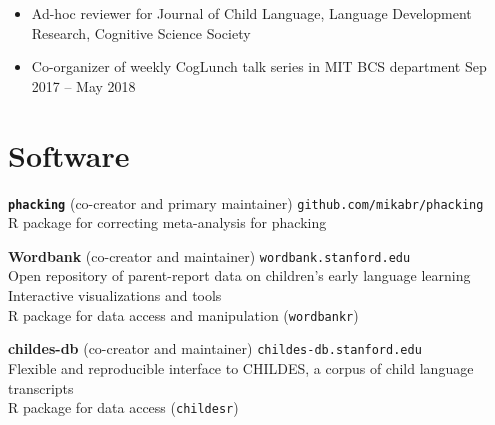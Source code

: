 \documentclass[11pt,]{article}
\providecommand{\tightlist}{%
  \setlength{\itemsep}{0pt}\setlength{\parskip}{0pt}}
\begin{document}
\begin{itemize}
\tightlist
\item
  Ad-hoc reviewer for Journal of Child Language, Language Development
  Research, Cognitive Science Society
\item
  Co-organizer of weekly CogLunch talk series in MIT BCS department
  \hfill Sep 2017 -- May 2018
\end{itemize}

\hypertarget{software}{%
\section{Software}\label{software}}

\textbf{\texttt{phacking}} (co-creator and primary maintainer)
\hfill \texttt{github.com/mikabr/phacking}\\
\hspace*{0.333em}\hspace*{0.333em}\hspace*{0.333em}R package for
correcting meta-analysis for phacking

\textbf{Wordbank} (co-creator and maintainer)
\hfill \texttt{wordbank.stanford.edu}\\
\hspace*{0.333em}\hspace*{0.333em}\hspace*{0.333em}Open repository of
parent-report data on children's early language learning \\
\hspace*{0.333em}\hspace*{0.333em}\hspace*{0.333em}Interactive
visualizations and tools \\
\hspace*{0.333em}\hspace*{0.333em}\hspace*{0.333em}R package for data
access and manipulation (\texttt{wordbankr})

\textbf{childes-db} (co-creator and maintainer)
\hfill \texttt{childes-db.stanford.edu}\\
\hspace*{0.333em}\hspace*{0.333em}\hspace*{0.333em}Flexible and
reproducible interface to CHILDES, a corpus of child language
transcripts \\
\hspace*{0.333em}\hspace*{0.333em}\hspace*{0.333em}R package for data
access (\texttt{childesr})
\end{document}
